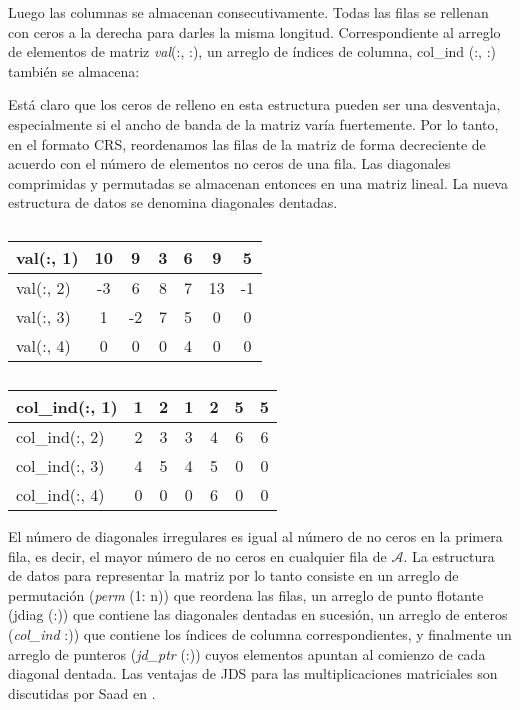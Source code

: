 \documentclass[a4paper,openright,12pt, oneside]{book}
\begin{document}
Luego las columnas se almacenan consecutivamente. Todas las filas se rellenan con ceros a la derecha para darles la misma longitud. Correspondiente al arreglo de elementos de matriz \textit{val}(:, :), un arreglo de \'indices de columna, col\_ind (:, :) tambi\'en se almacena:

Est\'a claro que los ceros de relleno en esta estructura pueden ser una desventaja, especialmente si el ancho de banda de la matriz varía fuertemente. Por lo tanto, en el formato CRS, reordenamos las filas de la matriz de forma decreciente de acuerdo con el n\'umero de elementos no ceros de una fila. Las diagonales comprimidas y permutadas se almacenan entonces en una matriz lineal. La nueva estructura de datos se denomina diagonales dentadas.



\begin{table}[htdp]
    \caption{}
    \begin{tabular}{ | l || c | c | c | c | c | c |}
      \hline
      val(:, 1) & 10 & 9 & 3 & 6 & 9 & 5 \\ \hline 
      val(:, 2) & -3 & 6 & 8 & 7 & 13 & -1 \\ \hline
      val(:, 3) & 1 & -2 & 7 & 5 & 0 & 0 \\ \hline
      val(:, 4) & 0 & 0 & 0 & 4 & 0 & 0 \\ \hline 
    \end{tabular}
\end{table}

\begin{table}[htdp]
    \caption{}
    \begin{tabular}{| l || c | c | c | c | c | c |}
        \hline
      col\_ind(:, 1) & 1 & 2 & 1 & 2 & 5 & 5 \\ \hline
      col\_ind(:, 2) & 2 & 3 & 3 & 4 & 6 & 6 \\ \hline
      col\_ind(:, 3) & 4 & 5 & 4 & 5 & 0 & 0 \\ \hline
      col\_ind(:, 4) & 0 & 0 & 0 & 6 & 0 & 0 \\ \hline
    \end{tabular}
\end{table}


El n\'umero de diagonales irregulares es igual al n\'umero de no ceros en la primera fila, es decir, el mayor n\'umero de no ceros en cualquier fila de $\mathcal{A}$. La estructura de datos para representar la matriz por lo tanto consiste en un arreglo de permutaci\'on (\textit{perm} (1: n)) que reordena las filas, un arreglo de punto flotante (jdiag (:)) que contiene las diagonales dentadas en sucesi\'on, un arreglo de enteros (\textit{col\_ind} :)) que contiene los \'indices de columna correspondientes, y finalmente un arreglo de punteros (\textit{jd\_ptr} (:)) cuyos elementos apuntan al comienzo de cada diagonal dentada. Las ventajas de JDS para las multiplicaciones matriciales son discutidas por Saad en \cite{JDS}.
\end{document}
